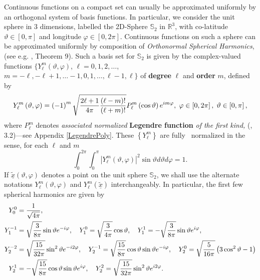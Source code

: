 \documentclass[preprint,11pt,a4paper]{elsarticle}
\begin{document}
Continuous functions on a compact set can usually be approximated uniformly
by an orthogonal system of basis functions. In particular, we consider the
unit sphere in 3 dimensions, labelled the 2D-Sphere $\mathbb{S}_{2}$ in $%
\mathbb{R}^{3}$, with co-latitude $\vartheta\in\left[ 0,\pi\right] $ and
longitude $\varphi\in\left[ 0,2\pi\right] $. Continuous functions on such a
sphere can be approximated uniformly by composition of \textit{Orthonormal
Spherical Harmonics}, (see e.g. \cite{Mueller1966}, Theorem 9). Such a basis
set for $\mathbb{S}_{2}$ is given by the complex-valued functions $\{Y_{\ell
}^{m}\left( \vartheta,\varphi\right) $, $\ell=0,1,2,\ldots$, \ \ $m=-\ell
,-\ell+1,\ldots-1,0,1,\ldots,\ell-1,\ell\}$ of \textbf{degree} $\ell$ and 
\textbf{order} $m$, defined by 
\begin{equation}
Y_{\ell}^{m}\left( \vartheta,\varphi\right) =\left( -1\right) ^{m}\sqrt{%
\frac{2\ell+1}{4\pi}\frac{\left( \ell-m\right) !}{\left( \ell+m\right) !}}%
P_{\ell}^{m}\left( \cos\vartheta\right) e^{im\varphi },\;\varphi\in\left[
0,2\pi\right] ,\;\vartheta\in\left[ 0,\pi\right] ,
\label{SpheriHarmOrthoNorm}
\end{equation}
where $P_{\ell}^{m}$ denotes \textit{associated normalized }\textbf{Legendre
function} \textit{of the first kind, }(\cite{Erdelyi11a}, 3.2)---see
Appendix \ref{LegendrePoly}. These $\left\{ Y_{\ell}^{m}\right\} $ are fully%
\textit{\ }normalized in the sense, for each $\ell$ and $m$ 
\begin{equation*}
\int_{0}^{2\pi}\int_{0}^{\pi}\left\vert Y_{\ell}^{m}\left( \vartheta
,\varphi\right) \right\vert ^{2}\sin\vartheta d\vartheta d\varphi=1.
\end{equation*}
\smallskip If $\underline{\widetilde{x}}\left( \vartheta,\varphi\right) $
denotes a point on the unit sphere $\mathbb{S}_{2}$, we shall use the
alternate notations $Y_{\ell}^{m}\left( \vartheta,\varphi\right) $ and $%
Y_{\ell}^{m}\left( \underline{\widetilde{x}}\right) $ interchangeably. In
particular, the first few spherical harmonics are given by 
\begin{align}
Y_{0}^{0} & =\frac{1}{\sqrt{4\pi}},  \label{Y_eleje} \\
Y_{1}^{-1} & =\sqrt{\frac{3}{8\pi}}\sin\vartheta e^{-i\varphi},\quad
Y_{1}^{0}=\sqrt{\frac{3}{4\pi}}\cos\vartheta,\quad Y_{1}^{1}=-\sqrt{\frac {3%
}{8\pi}}\sin\vartheta e^{i\varphi},  \notag \\
Y_{2}^{-2} & =\sqrt{\frac{15}{32\pi}}\sin^{2}\vartheta e^{-i2\varphi},\quad
Y_{2}^{-1}=\sqrt{\frac{15}{8\pi}}\cos\vartheta\sin\vartheta e^{-i\varphi
},\quad Y_{2}^{0}=\sqrt{\frac{5}{16\pi}}\left( 3\cos^{2}\vartheta-1\right) 
\notag \\
Y_{2}^{1} & =-\sqrt{\frac{15}{8\pi}}\cos\vartheta\sin\vartheta e^{i\varphi
},\quad Y_{2}^{2}=\sqrt{\frac{15}{32\pi}}\sin^{2}\vartheta e^{i2\varphi }. 
\notag
\end{align}
\end{document}
